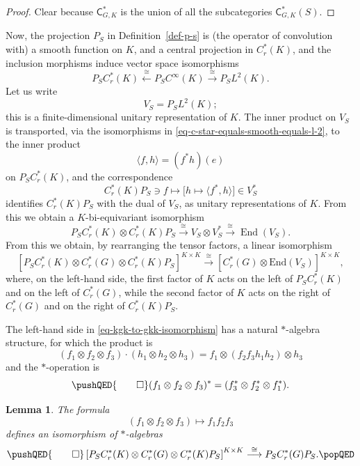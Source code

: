 \documentclass[leqno,11pt]{amsart}
\numberwithin{equation}{subsection}
\theoremstyle{plain}
\newtheorem{lemma}[equation]{Lemma}
\theoremstyle{definition}
\theoremstyle{remark}
\newcommand{\CC}{\mathsf{C}}
\DeclareMathOperator{\End}{End}
\begin{document}
\begin{proof}
 Clear because $\CC^*_{G,K}$ is the union of all the subcategories $\CC^*_{G,K}(S)$.
\end{proof}

Now, the projection $P_S$ in Definition~\ref{def-p-s} is (the operator of convolution with) a smooth function on $K$, and a central projection in $C^*_r(K)$, and the inclusion morphisms induce vector space isomorphisms
\begin{equation}
    \label{eq-c-star-equals-smooth-equals-l-2}
P_S C^*_r (K) \stackrel\cong\longleftarrow P_S C^\infty (K) \stackrel \cong \longrightarrow P_SL^2(K).
\end{equation}
Let us write 
\[
V_S = P_S L^2(K);
\]
this is a finite-dimensional unitary representation of $K$. The inner product on $V_S$ is transported, via the isomorphisms in \eqref{eq-c-star-equals-smooth-equals-l-2}, to the inner product
\[
\langle f,h\rangle = (f^*h)(e)
\]
on $P_S C^*_r (K)$, and the correspondence  
\[
C^*_r(K)P_S \ni f \longmapsto \bigl [  h\mapsto \langle f^*, h\rangle \bigr] \in V_S^*
\]
identifies $C^*_r(K)P_S$ with the  dual of $V_S$, as unitary representations of $K$. From this we obtain  a $K$-bi-equivariant isomorphism
\[
P_SC^*_r (K)\otimes C^*_r(K)P_S \stackrel \cong \longrightarrow 
 V_S \otimes V_S^* \stackrel \cong \longrightarrow \End (V_S).
\]
From this we obtain, by rearranging the tensor factors, a linear isomorphism
\begin{equation}
    \label{eq-kgk-to-gkk-isomorphism}
\left[P_S C^*_r(K) \otimes C^*_r(G) \otimes C^*_r(K)P_S\right]^{K \times K} \stackrel \cong\longrightarrow  \left[ C^*_r(G) \otimes \mathrm{End}(V_S) \right]^{K \times K},
\end{equation}
where, on the left-hand side, the first factor of $K$ acts on the left of $P_S C^*_r (K)$ and on the left of $C^*_r(G)$, while the second factor of $K$ acts on the right  of $C^*_r(G)$ and on the right of $C^*_r (K)P_S$. 

The left-hand side in \eqref{eq-kgk-to-gkk-isomorphism} has a natural $*$-algebra structure, for which the  product is
\[
(f_1 \otimes f_2 \otimes f_3) \cdot (h_1 \otimes h_2 \otimes h_3) = f_1 \otimes (f_2  f_3  h_1  h_2) \otimes h_3
\]
and   the  $*$-operation  is
\[
\pushQED{\qed}
(f_1 \otimes f_2 \otimes f_3)^* =  (f_3^* \otimes f_2^* \otimes f_1^*)  .
\]


 

\begin{lemma}
\label{lem-c-star-algebra-as-endomorphism-algebra}
The formula 
\[
(f_1 \otimes f_2 \otimes f_3) \mapsto f_1  f_2   f_3
\]
defines an isomorphism of $*$-algebras
\[
\pushQED{\qed}
\left[P_S C^*_r(K) \otimes C^*_r(G) \otimes C^*_r(K)P_S\right]^{K \times K} \stackrel \cong   \longrightarrow  P_SC^*_r(G)P_S.
\qedhere
\popQED
\]
\end{lemma}
\end{document}
